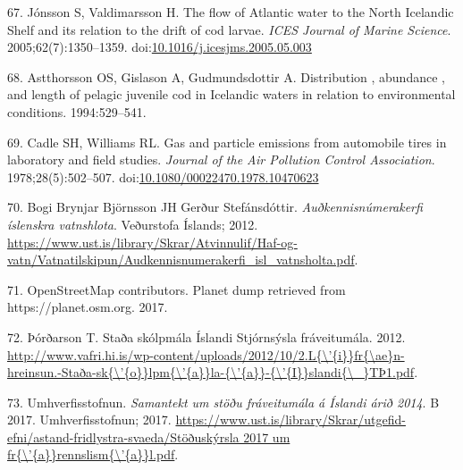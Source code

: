 \documentclass[icelandic,]{book}
\begin{document}
\leavevmode\hypertarget{ref-Strait2005a}{}%
67. Jónsson S, Valdimarsson H. The flow of Atlantic water to the North Icelandic Shelf and its relation to the drift of cod larvae. \emph{ICES Journal of Marine Science}. 2005;62(7):1350--1359. doi:\href{https://doi.org/10.1016/j.icesjms.2005.05.003}{10.1016/j.icesjms.2005.05.003}

\leavevmode\hypertarget{ref-Astthorsson1994}{}%
68. Astthorsson OS, Gislason A, Gudmundsdottir A. Distribution , abundance , and length of pelagic juvenile cod in Icelandic waters in relation to environmental conditions. 1994:529--541.

\leavevmode\hypertarget{ref-Cadle1978}{}%
69. Cadle SH, Williams RL. Gas and particle emissions from automobile tires in laboratory and field studies. \emph{Journal of the Air Pollution Control Association}. 1978;28(5):502--507. doi:\href{https://doi.org/10.1080/00022470.1978.10470623}{10.1080/00022470.1978.10470623}

\leavevmode\hypertarget{ref-Bj2012}{}%
70. Bogi Brynjar Björnsson JH Gerður Stefánsdóttir. \emph{Auðkennisnúmerakerfi íslenskra vatnshlota}. Veðurstofa Íslands; 2012. \url{https://www.ust.is/library/Skrar/Atvinnulif/Haf-og-vatn/Vatnatilskipun/Audkennisnumerakerfi_isl_vatnsholta.pdf}.

\leavevmode\hypertarget{ref-OpenStreetMap}{}%
71. OpenStreetMap contributors. Planet dump retrieved from https://planet.osm.org. 2017.

\leavevmode\hypertarget{ref-uxdeoruxf0arson2012}{}%
72. Þórðarson T. Staða skólpmála Íslandi Stjórnsýsla fráveitumála. 2012. \href{http://www.vafri.hi.is/wp-content/uploads/2012/10/2.L\%7B/'\%7Bi\%7D\%7Dfr\%7B/ae\%7Dn-hreinsun.-Staða-sk\%7B/'\%7Bo\%7D\%7Dlpm\%7B/'\%7Ba\%7D\%7Dla-\%7B/'\%7Ba\%7D\%7D-\%7B/'\%7BI\%7D\%7Dslandi\%7B/_\%7DTÞ1.pdf}{http://www.vafri.hi.is/wp-content/uploads/2012/10/2.L\{\textbackslash{}'\{i\}\}fr\{\textbackslash{}ae\}n-hreinsun.-Staða-sk\{\textbackslash{}'\{o\}\}lpm\{\textbackslash{}'\{a\}\}la-\{\textbackslash{}'\{a\}\}-\{\textbackslash{}'\{I\}\}slandi\{\textbackslash{}\_\}TÞ1.pdf}.

\leavevmode\hypertarget{ref-Umhverfisstofnun2017}{}%
73. Umhverfisstofnun. \emph{Samantekt um stöðu fráveitumála á Íslandi árið 2014}. B 2017. Umhverfisstofnun; 2017. \href{https://www.ust.is/library/Skrar/utgefid-efni/astand-fridlystra-svaeda/Stöðuskýrsla\%202017\%20um\%20fr\%7B/'\%7Ba\%7D\%7Drennslism\%7B/'\%7Ba\%7D\%7Dl.pdf}{https://www.ust.is/library/Skrar/utgefid-efni/astand-fridlystra-svaeda/Stöðuskýrsla 2017 um fr\{\textbackslash{}'\{a\}\}rennslism\{\textbackslash{}'\{a\}\}l.pdf}.
\end{document}
